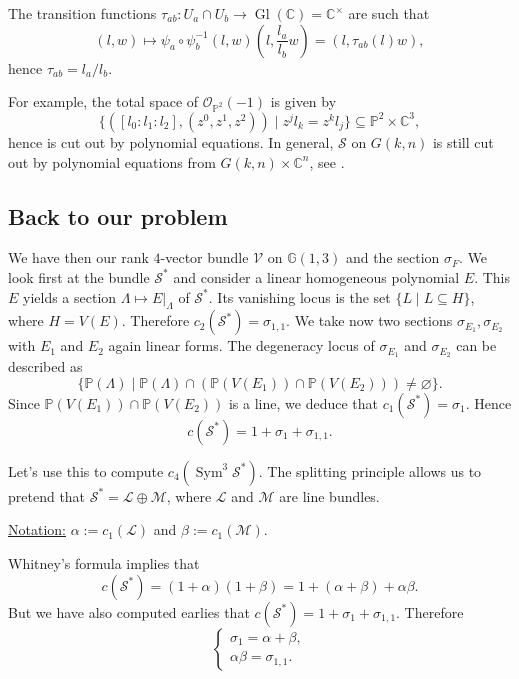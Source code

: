 \documentclass[12pt,a4paper]{amsart}
\theoremstyle{plain}
\theoremstyle{definition}
\theoremstyle{remark}
\begin{document}
The transition functions $\tau_{ab} \colon U_{a} \cap U_{b} \to \operatorname{Gl}(\mathbb{C}) = \mathbb{C}^{\times}$ are such that
\[ (l,w) \mapsto \psi_{a} \circ \psi_{b}^{-1}(l,w)  \left(l, \frac{l_{a}}{l_{b}} w\right) = (l,\tau_{ab}(l)w), \]
hence $\tau_{ab} = l_{a}/l_{b}$.

For example, the total space of $\mathscr{O}_{\mathbb{P}^{2}}(-1)$ is given by
\[ \{ ([l_{0} : l_{1} : l_{2}] , (z^{0}, z^{1}, z^{2})) \mid z^{j}l_{k} = z^{k}l_{j} \} \subseteq \mathbb{P}^{2} \times \mathbb{C}^{3}, \]
hence is cut out by polynomial equations.
In general, $\mathscr{S}$ on $G(k,n)$ is still cut out by polynomial equations from $G(k,n) \times \mathbb{C}^{n}$, see \cite[\S 3.2.3]{eh16}.

\subsection{Back to our problem}

We have then our rank $4$-vector bundle $\mathscr{V}$ on $\mathbb{G}(1,3)$ and the section $\sigma_{F}$.
We look first at the bundle $\mathscr{S}^{*}$ and consider a linear homogeneous polynomial $E$.
This $E$ yields a section $\Lambda \mapsto E|_{\Lambda}$ of $\mathscr{S}^{*}$.
Its vanishing locus is the set $\{ L \mid L \subseteq H\}$, where $H = V(E)$.
Therefore $c_{2}(\mathscr{S}^{*}) = \sigma_{1,1}$.
We take now two sections $\sigma_{E_{1}}, \sigma_{E_{2}}$ with $E_{1}$ and $E_{2}$ again linear forms.
The degeneracy locus of $\sigma_{E_{1}}$ and $\sigma_{E_{2}}$ can be described as
\[ \{ \mathbb{P}(\Lambda) \mid \mathbb{P}(\Lambda) \cap (\mathbb{P}(V(E_{1})) \cap \mathbb{P}(V(E_{2}))) \neq \varnothing \}. \]
Since $\mathbb{P}(V(E_{1})) \cap \mathbb{P}(V(E_{2}))$ is a line, we deduce that $c_{1}(\mathscr{S}^{*}) = \sigma_{1}$.
Hence
\[ c(\mathscr{S}^{*}) = 1 + \sigma_{1} + \sigma_{1,1}. \]

Let's use this to compute $c_{4}(\operatorname{Sym}^{3}\mathscr{S}^{*})$.
The splitting principle allows us to pretend that $\mathscr{S}^{*} = \mathscr{L} \oplus \mathscr{M}$, where $\mathscr{L}$ and $\mathscr{M}$ are line bundles.

\underline{Notation:} $\alpha := c_{1}(\mathscr{L})$ and $\beta := c_{1}(\mathscr{M})$.

Whitney's formula implies that
\[ c(\mathscr{S}^{*}) = (1 + \alpha)(1 + \beta) = 1 + (\alpha + \beta) + \alpha\beta. \]
But we have also computed earlies that $c(\mathscr{S}^{*}) = 1 + \sigma_{1} + \sigma_{1,1}$.
Therefore
\[ \begin{cases} \sigma_{1} = \alpha + \beta, \\
  \alpha\beta = \sigma_{1,1}.
\end{cases} \]
\end{document}
